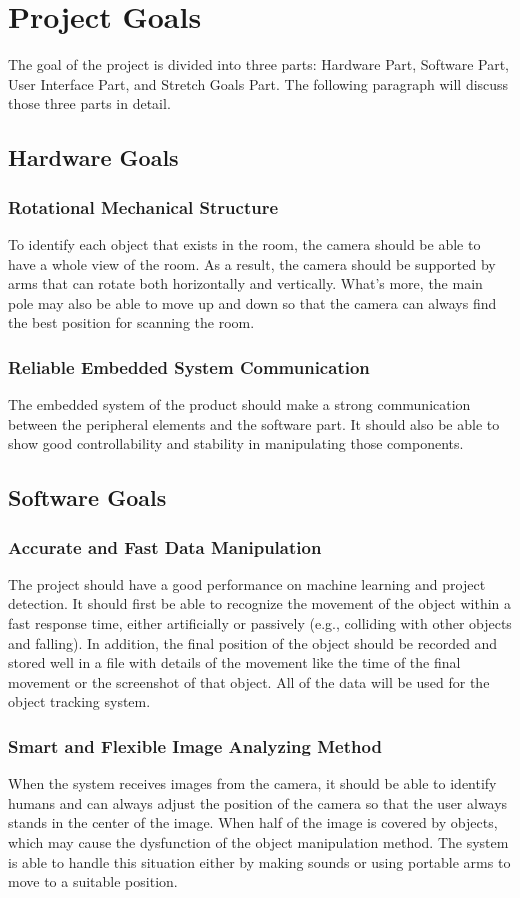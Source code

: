 \documentclass{article}
\begin{document}
\section{Project Goals}
The goal of the project is divided into three parts: Hardware Part, Software Part, User Interface Part, and Stretch Goals Part. The following paragraph will discuss those three parts in detail. 
\subsection{Hardware Goals}
\subsubsection{Rotational Mechanical Structure}
To identify each object that exists in the room, the camera should be able to have a whole view of the room. As a result, the camera should be supported by arms that can rotate both horizontally and vertically. What’s more, the main pole may also be able to move up and down so that the camera can always find the best position for scanning the room.
\subsubsection{Reliable Embedded System Communication}
The embedded system of the product should make a strong communication between the peripheral elements and the software part. It should also be able to show good controllability and stability in manipulating those components.
\subsection{Software Goals}
\subsubsection{Accurate and Fast Data Manipulation}
The project should have a good performance on machine learning and project detection. It should first be able to recognize the movement of the object within a fast response time, either artificially or passively (e.g., colliding with other objects and falling). In addition, the final position of the object should be recorded and stored well in a file with details of the movement like the time of the final movement or the screenshot of that object. All of the data will be used for the object tracking system.
\subsubsection{Smart and Flexible Image Analyzing Method}
When the system receives images from the camera, it should be able to identify humans and can always adjust the position of the camera so that the user always stands in the center of the image. When half of the image is covered by objects, which may cause the dysfunction of the object manipulation method. The system is able to handle this situation either by making sounds or using portable arms to move to a suitable position. 
\end{document}

